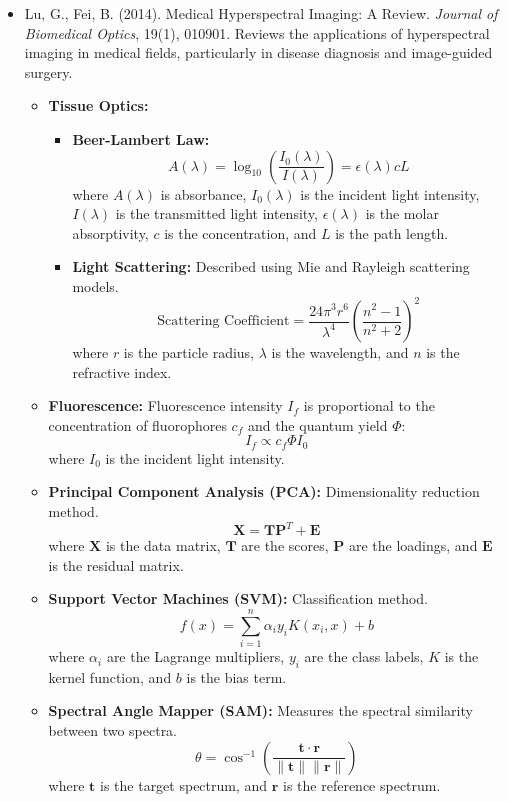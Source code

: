 \documentclass[10pt,svgnames,fragile]{beamer}
\begin{document}
\begin{frame}
\tiny
\begin{itemize}

    \item Lu, G., Fei, B. (2014). Medical Hyperspectral Imaging: A Review. \textit{Journal of Biomedical Optics}, 19(1), 010901. \href{https://www.spiedigitallibrary.org/journals/journal-of-biomedical-optics/volume-19/issue-01/010901/Medical-hyperspectral-imaging-a-review/10.1117/1.JBO.19.1.010901.full}{\color{blue}{DOI: 10.1117/1.JBO.19.1.010901}}
    {\color{gray}Reviews the applications of hyperspectral imaging in medical fields, particularly in disease diagnosis and image-guided surgery.}
    \begin{itemize} \tiny
    \item \textbf{Tissue Optics:}
    \begin{itemize} \tiny
        \item \textbf{Beer-Lambert Law:}
        \[
        A(\lambda) = \log_{10}\left(\frac{I_0(\lambda)}{I(\lambda)}\right) = \epsilon(\lambda) c L
        \]
        where \(A(\lambda)\) is absorbance, \(I_0(\lambda)\) is the incident light intensity, \(I(\lambda)\) is the transmitted light intensity, \(\epsilon(\lambda)\) is the molar absorptivity, \(c\) is the concentration, and \(L\) is the path length.
        \item \textbf{Light Scattering:} Described using Mie and Rayleigh scattering models.
        \[
        \text{Scattering Coefficient} = \frac{24\pi^3 r^6}{\lambda^4} \left(\frac{n^2-1}{n^2+2}\right)^2
        \]
        where \(r\) is the particle radius, \(\lambda\) is the wavelength, and \(n\) is the refractive index.
    \end{itemize}
    \item \textbf{Fluorescence:} Fluorescence intensity \(I_f\) is proportional to the concentration of fluorophores \(c_f\) and the quantum yield \(\Phi\):
    \[
    I_f \propto c_f \Phi I_0
    \]
    where \(I_0\) is the incident light intensity.
    \item \textbf{Principal Component Analysis (PCA):} Dimensionality reduction method.
    \[
    \mathbf{X} = \mathbf{TP}^T + \mathbf{E}
    \]
    where \(\mathbf{X}\) is the data matrix, \(\mathbf{T}\) are the scores, \(\mathbf{P}\) are the loadings, and \(\mathbf{E}\) is the residual matrix.
    \item \textbf{Support Vector Machines (SVM):} Classification method.
    \[
    f(x) = \sum_{i=1}^{n} \alpha_i y_i K(x_i, x) + b
    \]
    where \(\alpha_i\) are the Lagrange multipliers, \(y_i\) are the class labels, \(K\) is the kernel function, and \(b\) is the bias term.
    \item \textbf{Spectral Angle Mapper (SAM):} Measures the spectral similarity between two spectra.
    \[
    \theta = \cos^{-1} \left(\frac{\mathbf{t} \cdot \mathbf{r}}{\|\mathbf{t}\| \|\mathbf{r}\|}\right)
    \]
    where \(\mathbf{t}\) is the target spectrum, and \(\mathbf{r}\) is the reference spectrum.
\end{itemize}

\end{itemize}
\end{frame}
\end{document}
